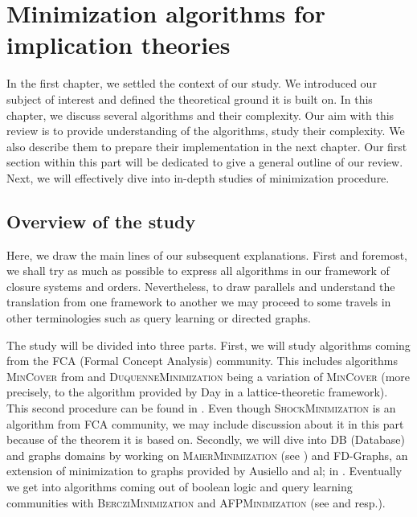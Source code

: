 \chapter{Minimization algorithms for implication theories}

In the first chapter, we settled the context of our study. We introduced our 
subject of interest and defined the theoretical ground it is built on. In this
chapter, we discuss several algorithms and their complexity. Our aim with this
review is to provide understanding of the algorithms, study their complexity.
We also describe them to prepare their implementation in the next chapter.  Our first section within this part will be dedicated to give a general outline of our review. Next, we will effectively dive into in-depth studies of minimization procedure. 


\section{Overview of the study}

Here, we draw the main lines of our subsequent explanations. First and foremost, we shall try as much as possible to express all algorithms in our framework of closure systems and orders. Nevertheless, to draw parallels
and understand the translation from one framework to another we may proceed to 
some travels in other terminologies such as query learning or directed graphs.

\vspace{1.2em}

The study will be divided into three parts. First, we will study algorithms 
coming from the FCA (Formal Concept Analysis) community. This includes 
algorithms \textsc{MinCover} from \cite{bazhanov_optimizations_2014, day_lattice_1992, wild_implicational_1989} and \textsc{DuquenneMinimization}
being a variation of \textsc{MinCover} (more precisely, to the algorithm
provided by Day in a lattice-theoretic framework). This second procedure can
be found in \cite{duquenne_variations_2007}. Even though \textsc{ShockMinimization} is an algorithm from FCA community, we may include
discussion about it in this part because of the theorem it is based on. Secondly, we will dive into DB (Database) and graphs domains by working on
\textsc{MaierMinimization} (see \cite{maier_theory_1983, david_minimum_1980}) and FD-Graphs, an extension of minimization to graphs provided by Ausiello and al; in \cite{ausiello_graph_1983, ausiello_minimal_1986, ausiello_directed_2017}. Eventually we get into algorithms coming out of 
boolean logic and query learning communities with \textsc{BercziMinimization}
and \textsc{AFPMinimization} (see \cite{berczi_directed_2017} and \cite{angluin_learning_1992, arias_canonical_2009} resp.).

